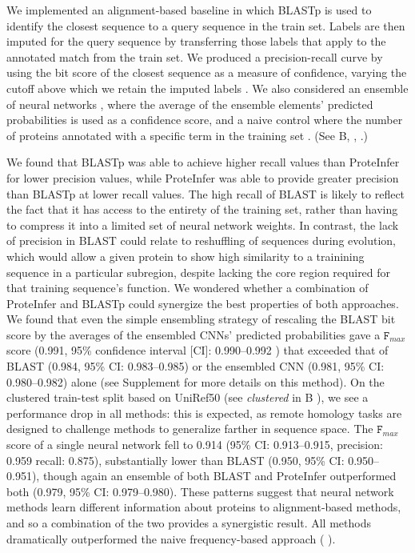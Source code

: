 We implemented an alignment-based baseline in which BLASTp is used to identify the closest sequence to a query sequence in the train set. Labels are then imputed for the query sequence by transferring those labels that apply to the annotated match from the train set. We produced a precision-recall curve by using the bit score of the closest sequence as a measure of confidence, varying the cutoff above which we retain the imputed labels \cite{zhou2019cafa, eddy2011accelerated}. We also considered an ensemble of neural networks \cite{bileschi}, where the average of the ensemble elements' predicted probabilities is used as a confidence score, and a naive control where the number of proteins annotated with a specific term in the training set \citep{radivojac2013large}. %
(See B, , .)

We found that BLASTp was able to achieve higher recall values than ProteInfer for lower precision values, while ProteInfer was able to provide greater precision than BLASTp at lower recall values. The high recall of BLAST is likely to reflect the fact that it has access to the entirety of the training set, rather than having to compress it into a limited set of neural network weights. In contrast, the lack of precision in BLAST could relate to reshuffling of sequences during evolution, which would allow a given protein to show high similarity to a trainining sequence in a particular subregion, despite lacking the core region required for that training sequence's function.  We wondered whether a combination of ProteInfer and BLASTp could synergize the best properties of both approaches. We found that even the simple ensembling strategy of rescaling the BLAST bit score by the averages of the ensembled CNNs' predicted probabilities gave a $\texttt{F}_{max}$ score (0.991, 95\% confidence interval [CI]: 0.990--0.992 ) that exceeded that of BLAST (0.984, 95\% CI: 0.983--0.985) or the ensembled CNN (0.981, 95\% CI: 0.980--0.982) alone (see Supplement for more details on this method). 
On the clustered train-test split based on UniRef50 (see \textit{clustered} in B%
), we see a performance drop in all methods: this is expected, as remote homology tasks are designed to challenge methods to generalize farther in sequence space. The $\texttt{F}_{max}$ score of a single neural network fell to 0.914 (95\% CI: 0.913--0.915, precision: 0.959 recall: 0.875), substantially lower than BLAST (0.950, 95\% CI: 0.950--0.951), though again an ensemble of both BLAST and ProteInfer outperformed both (0.979, 95\% CI: 0.979--0.980). These patterns suggest that neural network methods learn different information about proteins to alignment-based methods, and so a combination of the two provides a synergistic result. All methods dramatically outperformed the naive frequency-based approach (%
).


